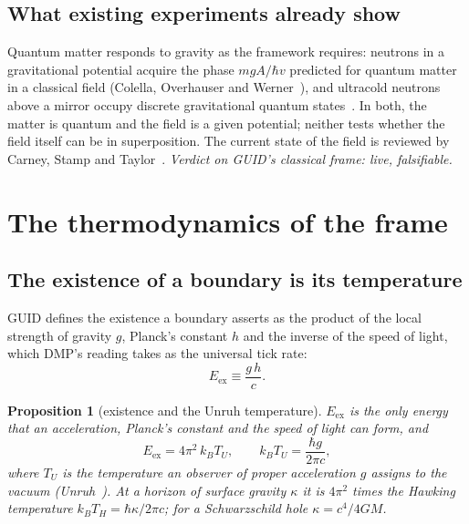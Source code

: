 \documentclass[11pt,a4paper]{article}
\newtheorem{proposition}{Proposition}
\theoremstyle{definition}
\theoremstyle{remark}
\theoremstyle{definition}
\begin{document}
\subsection{What existing experiments already show}

Quantum matter responds to gravity as the framework requires: neutrons in a gravitational potential acquire the phase $mgA/\hbar v$
predicted for quantum matter in a classical field (Colella, Overhauser and Werner~\cite{cow}), and ultracold neutrons above a mirror occupy
discrete gravitational quantum states~\cite{nesvizhevsky}. In both, the matter is quantum and the field is a given potential; neither tests
whether the field itself can be in superposition. The current state of the field is reviewed by Carney, Stamp and Taylor~\cite{cst}.
\emph{Verdict on GUID's classical frame: live, falsifiable.}

\section{The thermodynamics of the frame}\label{sec:thermo}

\subsection{The existence of a boundary is its temperature}

GUID defines the existence a boundary asserts as the product of the local strength of gravity $g$, Planck's constant $h$ and the
inverse of the speed of light, which DMP's reading takes as the universal tick rate:
\begin{equation}\label{eq:Eex}
E_{\text{ex}}\equiv\frac{g\,h}{c}.
\end{equation}

\begin{proposition}[existence and the Unruh temperature]\label{pr:unruh}
$E_{\text{ex}}$ is the only energy that an acceleration, Planck's constant and the speed of light can form, and
\begin{equation}\label{eq:unruh}
E_{\text{ex}}=4\pi^2\,k_BT_U,\qquad k_BT_U=\frac{\hbar g}{2\pi c},
\end{equation}
where $T_U$ is the temperature an observer of proper acceleration $g$ assigns to the vacuum (Unruh~\cite{unruh}). At a horizon of surface
gravity $\kappa$ it is $4\pi^2$ times the Hawking temperature $k_BT_H=\hbar\kappa/2\pi c$; for a Schwarzschild hole $\kappa=c^4/4GM$.
\end{proposition}
\end{document}
